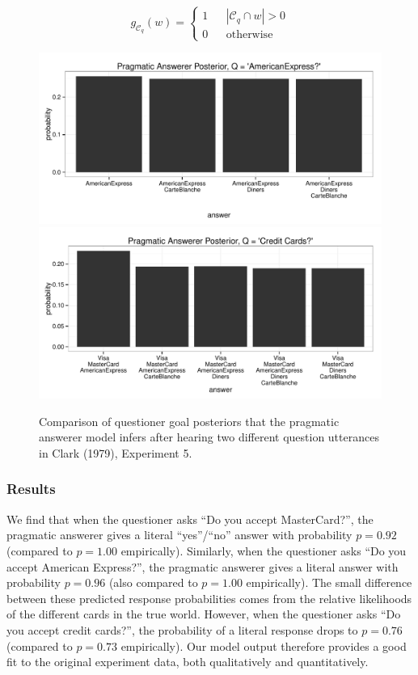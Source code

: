 \documentclass[12pt, floatsintext, jou]{apa6}
\begin{document}
$$g_{\mathcal{C}_q}(w) = \left\{\begin{array}{rcl} 1 && | \mathcal{C}_q \cap w | > 0 \\ 0 && \textrm{otherwise}\end{array}\right.$$
 \begin{figure}[t!]
\begin{center}
\includegraphics[scale = .6]{americanExpressPosterior.pdf}
\includegraphics[scale = .6]{creditCardsPosterior.pdf}
\end{center}
\vspace{-.25cm}
\caption{Comparison of questioner goal posteriors that the pragmatic answerer model infers after hearing two different question utterances in Clark (1979), Experiment 5.}
\label{fig:clarkExperiment5posteriors}
\end{figure}

\subsubsection{Results}

We find that when the questioner asks ``Do you accept MasterCard?'', the pragmatic answerer gives a literal ``yes''/``no'' answer with probability $p = 0.92$ (compared to $p=1.00$ empirically). Similarly, when the questioner asks ``Do you accept American Express?'', the pragmatic answerer gives a literal answer with probability $p = 0.96$ (also compared to $p=1.00$ empirically). The small difference between these predicted response probabilities comes from the relative likelihoods of the different cards in the true world. However, when the questioner asks ``Do you accept credit cards?'', the probability of a literal response drops to $p = 0.76$ (compared to $p=0.73$ empirically). Our model output therefore provides a good fit to the original experiment data, both qualitatively and quantitatively.
\end{document}

